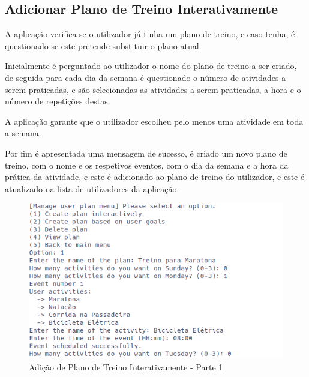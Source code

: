 \documentclass[a4paper,12pt]{scrreprt}
\begin{document}
    \clearpage
    \subsection{Adicionar Plano de Treino Interativamente}
    A aplicação verifica se o utilizador já tinha um plano de treino, e caso tenha,
    é questionado se este pretende substituir o plano atual.

    Inicialmente é perguntado ao utilizador o nome do plano de treino a ser criado,
    de seguida para cada dia da semana é questionado o número de atividades a serem praticadas,
    e são selecionadas as atividades a serem praticadas, a hora e o número de repetições destas.

    A aplicação garante que o utilizador escolheu pelo menos uma atividade em toda a semana.

    Por fim é apresentada uma mensagem de sucesso,
    é criado um novo plano de treino, com o nome e os respetivos eventos, com o dia
    da semana e a hora da prática da atividade, e este é adicionado ao plano de treino do utilizador,
    e este é atualizado na lista de utilizadores da aplicação.

    \begin{figure}[!ht]
        \centering
        \includegraphics[width=\textwidth]{images/createPlan1.png}
        \caption{Adição de Plano de Treino Interativamente - Parte 1}
        \label{fig:add-plan-1}
    \end{figure}
\end{document}

